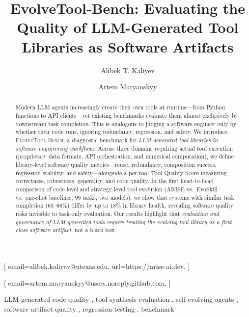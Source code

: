 \documentclass[]{ceurart}
\begin{document}


\title{EvolveTool-Bench: Evaluating the Quality of LLM-Generated Tool Libraries as Software Artifacts}

\author[1]{Alibek T. Kaliyev}[%
email=alibek.kaliyev@utexas.edu,
url=https://arise-ai.dev,
]
\cormark[1]
\author[2]{Artem Maryanskyy}[%
email=artem.maryanskyy@users.noreply.github.com,
]
\address[1]{University of Texas at Austin, Austin, TX, USA}
\address[2]{Independent Researcher, USA}

\begin{abstract}
Modern LLM agents increasingly create their own tools at runtime---from Python functions to API clients---yet existing benchmarks evaluate them almost exclusively by downstream task completion. This is analogous to judging a software engineer only by whether their code runs, ignoring redundancy, regression, and safety. We introduce \textsc{EvolveTool-Bench}, a diagnostic benchmark for \emph{LLM-generated tool libraries in software engineering workflows}. Across three domains requiring actual tool execution (proprietary data formats, API orchestration, and numerical computation), we define library-level software quality metrics---reuse, redundancy, composition success, regression stability, and safety---alongside a per-tool Tool Quality Score measuring correctness, robustness, generality, and code quality. In the first head-to-head comparison of code-level and strategy-level tool evolution (ARISE vs.\ EvoSkill vs.\ one-shot baselines, 99 tasks, two models), we show that systems with similar task completion (63--68\%) differ by up to 18\% in library health, revealing software quality risks invisible to task-only evaluation. Our results highlight that \emph{evaluation and governance of LLM-generated tools require treating the evolving tool library as a first-class software artifact}, not a black box.
\end{abstract}

\begin{keywords}
  LLM-generated code quality \sep
  tool synthesis evaluation \sep
  self-evolving agents \sep
  software artifact quality \sep
  regression testing \sep
  benchmark
\end{keywords}
\end{document}
